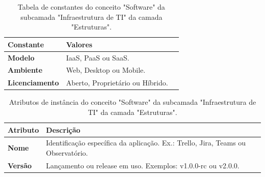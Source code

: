 \begin{apendicesenv}
\begin{table}[H]
\centering
\caption{Tabela de constantes do conceito "Software" da subcamada "Infraestrutura de TI" da camada "Estruturas".}
\begin{tabularx}{\textwidth}{|l|X|X|}
\hline
\textbf{Constante} & \textbf{Valores} \\ \hline
\textbf{Modelo} & IaaS, PaaS ou SaaS. \\ \hline
\textbf{Ambiente} & Web, Desktop ou Mobile.\\ \hline
\textbf{Licenciamento} & Aberto, Proprietário ou Híbrido.\\ \hline
\end{tabularx}
\end{table}

\begin{table}[H]
\centering
\caption{Atributos de instância do conceito "Software" da subcamada "Infraestrutura de TI" da camada "Estruturas".}
\begin{tabularx}{\textwidth}{|l|X|X|}
\hline
\textbf{Atributo} & \textbf{Descrição} \\ \hline
\textbf{Nome} & Identificação específica da aplicação. Ex.: Trello, Jira, Teams ou Observatório. \\ \hline
\textbf{Versão} & Lançamento ou release em uso. Exemplos: v1.0.0-rc ou v2.0.0. \\ \hline
\end{tabularx}
\end{table}



\end{apendicesenv}
